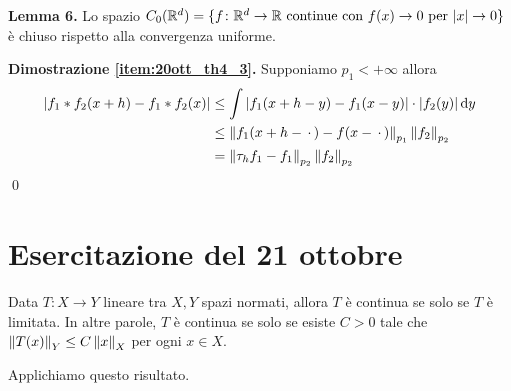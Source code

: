 \documentclass[a4paper, 12pt]{report}
\begin{document}
\textbf{Lemma 6.}
Lo spazio $C_0(\mathbb R^d) = \{ f \colon \mathbb R^d \to \mathbb R \text{ continue con } f(x) \to 0 \text{ per } |x| \to 0 \}$ è chiuso rispetto alla convergenza uniforme.

\textbf{Dimostrazione \ref{item:20ott_th4_3}.} 
Supponiamo $p_1 < +\infty$ allora
$$
\begin{aligned}
	|f_1 \ast f_2(x + h) - f_1 \ast f_2(x)|
	&\leq \int |f_1(x + h - y) - f_1(x - y)| \cdot |f_2(y)| \,\mathrm{d} y \\
	&\leq \left\lVert f_1(x + h - \,\cdot\,) - f(x - \,\cdot\,) \right\rVert_{p_1} \left\lVert f_2 \right\rVert_{p_2} \\
	&= \left\lVert \tau_h f_1 - f_1 \right\rVert_{p_2} \left\lVert f_2 \right\rVert_{p_2}
\end{aligned}
$$
\qed

%
%

\section{Esercitazione del 21 ottobre}


Data $T \colon X \to Y$ lineare tra $X,Y$ spazi normati, allora $T$ è continua se solo se $T$ è limitata.
In altre parole, $T$ è continua se solo se esiste  $C > 0$ tale che $\left\lVert T(x) \right\rVert_Y \leq C \left\lVert x \right\rVert_X$ per ogni $x \in X$.

Applichiamo questo risultato.
\end{document}
